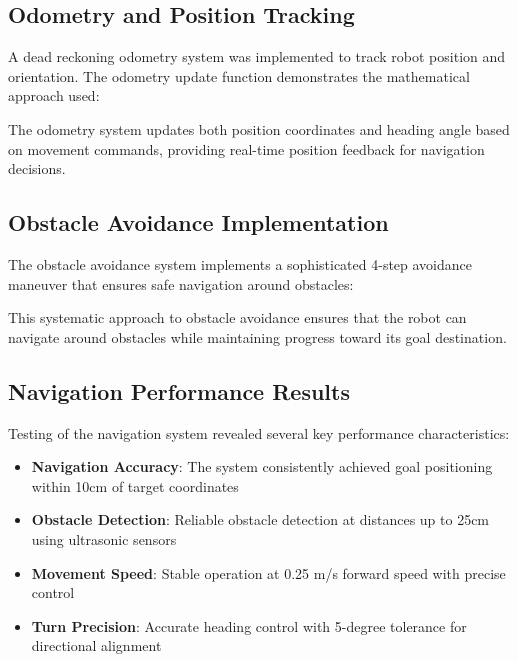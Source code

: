 \documentclass{book}
\begin{document}
\subsection{Odometry and Position Tracking}

\par\noindent A dead reckoning odometry system was implemented to track robot position and orientation. The odometry update function demonstrates the mathematical approach used:



\par\noindent The odometry system updates both position coordinates and heading angle based on movement commands, providing real-time position feedback for navigation decisions.

\subsection{Obstacle Avoidance Implementation}

\par\noindent The obstacle avoidance system implements a sophisticated 4-step avoidance maneuver that ensures safe navigation around obstacles:



\par\noindent This systematic approach to obstacle avoidance ensures that the robot can navigate around obstacles while maintaining progress toward its goal destination.

\subsection{Navigation Performance Results}

\par\noindent Testing of the navigation system revealed several key performance characteristics:

\begin{itemize}
\item \textbf{Navigation Accuracy}: The system consistently achieved goal positioning within 10cm of target coordinates
\item \textbf{Obstacle Detection}: Reliable obstacle detection at distances up to 25cm using ultrasonic sensors
\item \textbf{Movement Speed}: Stable operation at 0.25 m/s forward speed with precise control
\item \textbf{Turn Precision}: Accurate heading control with 5-degree tolerance for directional alignment
\end{itemize}
\end{document}
